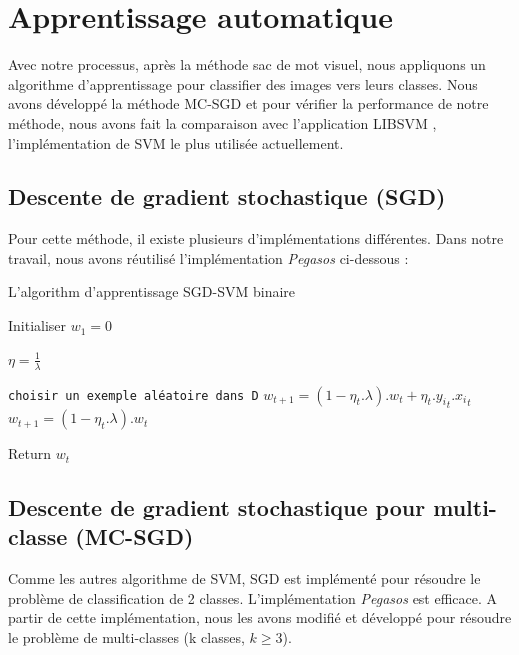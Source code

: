 \section{Apprentissage automatique}
Avec notre processus, après la méthode sac de mot visuel, nous appliquons un algorithme d'apprentissage pour classifier des images vers leurs classes. Nous avons développé la méthode MC-SGD et pour vérifier la performance de notre méthode, nous avons fait la comparaison avec l'application LIBSVM \cite{cl01}, l'implémentation de SVM le plus utilisée actuellement.

\subsection{Descente de gradient stochastique (SGD)}
Pour cette méthode, il existe plusieurs d'implémentations différentes. Dans notre travail, nous avons réutilisé l'implémentation \textit{Pegasos} \cite{sss07} ci-dessous :

\begin{algorithm}
\caption{L'algorithm d'apprentissage SGD-SVM binaire}\label{sgdal}
\begin{algorithmic}[1]

\State Initialiser $w_1 = 0$


\State $\eta = \frac{1}{\lambda}$

\State \texttt{choisir un exemple aléatoire dans D}
\State $w_{t+1} = (1 - \eta_t.\lambda).w_t + \eta_t.{y_i}_t.{x_i}_t$
\Else
\State $w_{t+1} = (1 - \eta_t.\lambda).w_t$
\EndIf
\EndFor

\EndFor

\State Return $w_{t}$

\EndProcedure
\end{algorithmic}
\end{algorithm}


\pagebreak
\subsection{Descente de gradient stochastique pour multi-classe (MC-SGD)}
Comme les autres algorithme de SVM, SGD est implémenté pour résoudre le problème de classification de 2 classes. L'implémentation \textit{Pegasos} \cite{sss07} est efficace. A partir de cette implémentation, nous les avons modifié et développé pour résoudre le problème de multi-classes (k classes, $k \geq 3$). \\

